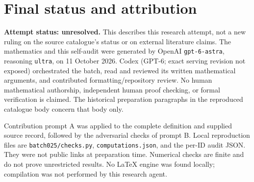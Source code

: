 \documentclass[11pt]{article}
\begin{document}
\section{Final status and attribution}
\textbf{Attempt status: unresolved.} This describes this research attempt, not a new ruling on the source catalogue's status or on external literature claims.
The mathematics and this self-audit were generated by OpenAI \texttt{gpt-6-astra}, reasoning \texttt{ultra}, on 11 October 2026. Codex (GPT-6; exact serving revision not exposed) orchestrated the batch, read and reviewed its written mathematical arguments, and contributed formatting/repository review. No human mathematical authorship, independent human proof checking, or formal verification is claimed. The historical preparation paragraphs in the reproduced catalogue body concern that body only.

Contribution prompt A was applied to the complete definition and supplied source record, followed by the adversarial checks of prompt B. Local reproduction files are \texttt{batch025/checks.py}, \texttt{computations.json}, and the per-ID audit JSON. They were not public links at preparation time. Numerical checks are finite and do not prove unrestricted results. No LaTeX engine was found locally; compilation was not performed by this research agent.
\end{document}
